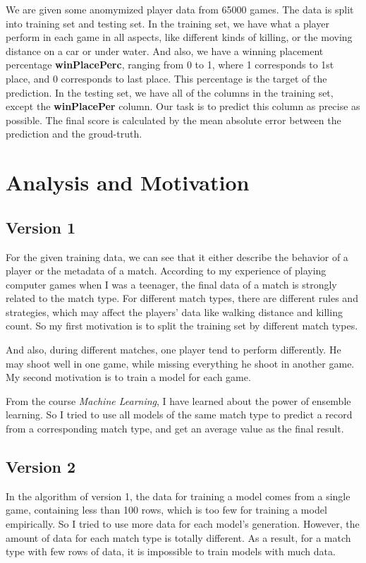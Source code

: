 \documentclass[journal=jacsat,manuscript=article]{achemso}
\begin{document}
We are given some anomymized player data from 65000 games. The data is split
into training set and testing set. In the training set, we have what a player
perform in each game in all aspects, like different kinds of killing, or the
moving distance on a car or under water. And also, we have a winning placement
percentage \textbf{winPlacePerc}, ranging from 0 to 1, where 1 corresponds to
1st place, and 0 corresponds to last place. This percentage is the target of
the prediction. In the testing set, we have all of the columns in the training
set, except the \textbf{winPlacePer} column. Our task is to predict this column
as precise as possible. The final score is calculated by the mean absolute error
between the prediction and the groud-truth.

\section{Analysis and Motivation}

\subsection{Version 1}

For the given training data, we can see that it either describe the behavior of a player
or the metadata of a match. According to my experience of playing computer games when I
was a teenager, the final data of a match is strongly related to the match type.
For different match types, there are different rules and strategies, which may affect the
players' data like walking distance and killing count. So my first motivation is to
split the training set by different match types.

And also, during different matches, one player tend to perform differently. He may shoot
well in one game, while missing everything he shoot in another game. My second motivation
is to train a model for each game.

From the course \emph{Machine Learning}, I have learned about the power of ensemble learning.
So I tried to use all models of the same match type to predict a record from a corresponding
match type, and get an average value as the final result.

\subsection{Version 2}

In the algorithm of version 1, the data for training a model comes from a single game,
containing less than 100 rows, which is too few for training a model empirically.
So I tried to use more data for each model's generation. However, the amount of
data for each match type is totally different. As a result, for a match type with few
rows of data, it is impossible to train models with much data.
\end{document}
